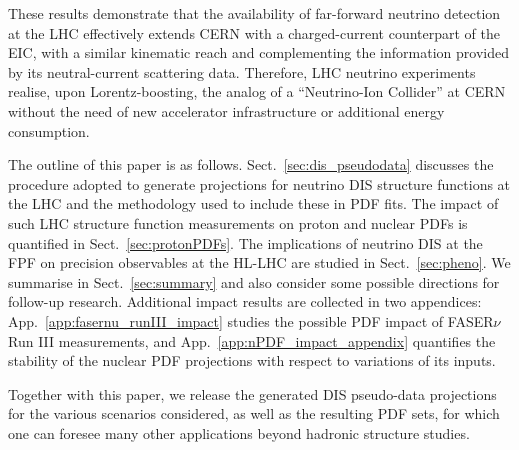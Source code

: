 These results demonstrate that the availability of far-forward neutrino detection
at the LHC effectively
extends CERN with a charged-current counterpart of the EIC,
with a similar kinematic reach and complementing
the information provided by its neutral-current scattering data.
%
Therefore, LHC neutrino experiments realise, upon Lorentz-boosting, the analog of
a ``Neutrino-Ion Collider'' at CERN
without the need of new accelerator infrastructure or additional energy consumption.

The outline of this paper is as follows.
%
Sect.~\ref{sec:dis_pseudodata} discusses the procedure
adopted to generate projections for neutrino DIS structure functions at the LHC
and the methodology used to include these in PDF fits.
%
The impact of such LHC structure function measurements on proton and nuclear
PDFs is quantified in Sect.~\ref{sec:protonPDFs}.
%
The implications of neutrino DIS at the FPF on precision observables
at the HL-LHC are studied in Sect.~\ref{sec:pheno}.
%
We summarise in Sect.~\ref{sec:summary} and also consider some possible
directions for follow-up research.
%
Additional impact results are collected in two appendices:
App.~\ref{app:fasernu_runIII_impact} studies the possible PDF impact
of FASER$\nu$ Run III measurements, and App.~\ref{app:nPDF_impact_appendix}
quantifies the stability of the nuclear PDF projections with respect
to variations of its inputs.


Together with this paper, we release the generated  DIS pseudo-data projections for the various scenarios
considered, as well as the resulting PDF sets, for which one can foresee
many other applications beyond hadronic structure studies.

